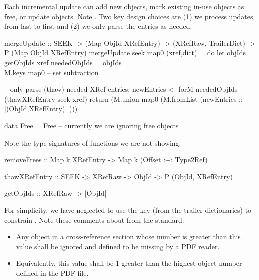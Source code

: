 Each incremental update can add new objects, mark existing in-use objects as
free, or update objects.  Note .
Two key design choices are (1) we process updates from last to first
and (2) we only parse the \xref{} entries as needed.

\begin{code}
mergeUpdate :: SEEK
            ->  (Map ObjId XRefEntry)
            -> (XRefRaw, TrailerDict)
            -> P (Map ObjId XRefEntry)
mergeUpdate seek map0 (xref,dict) =
    do
    let objIds       = getObjIds xref
        neededObjIds = objIds \\ M.keys map0
                       -- set subtraction

    -- only parse (thaw) needed XRef entries:
    newEntries <- forM neededObjIds
                       (thawXRefEntry seek xref)
    return (M.union map0 (M.fromList (newEntries :: [(ObjId,XRefEntry)] )))

data Free = Free  -- currently we are ignoring free objects
\end{code}
Note the type signatures of functions we are not showing:
\begin{code}
removeFrees :: Map k XRefEntry -> Map k (Offset :+: Type2Ref)

thawXRefEntry :: SEEK -> XRefRaw -> ObjId -> P (ObjId, XRefEntry)

getObjIds :: XRefRaw -> [ObjId]
\end{code}

For simplicity, we have neglected to use the  key (from
the trailer dictionaries) to constrain \objids{}.  Note these comments
about  from the standard:
\begin{itemize}
  \item Any object in a cross-reference section whose number is
    greater than this value shall be ignored and defined to be missing
    by a PDF reader.
  \item Equivalently, this value shall be 1 greater than the highest
    object number defined in the PDF file.
\end{itemize}

